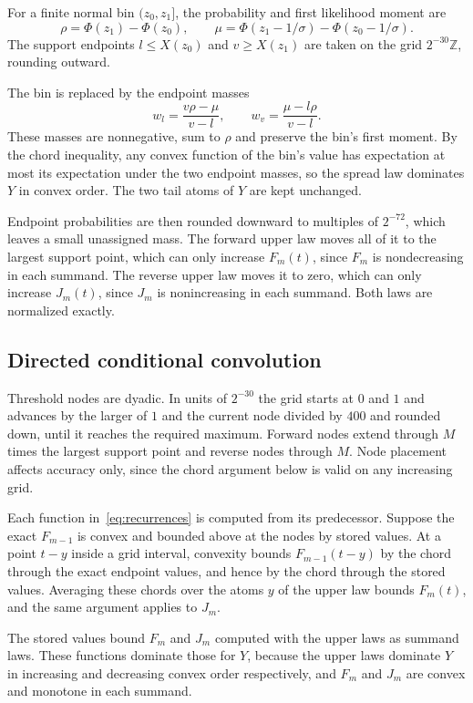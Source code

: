 \documentclass[conference]{IEEEtran}
\begin{document}
For a finite normal bin $(z_0,z_1]$, the probability and first likelihood moment are
\[
 \rho=\Phi(z_1)-\Phi(z_0),\qquad
 \mu=\Phi(z_1-1/\sigma)-\Phi(z_0-1/\sigma).
\]
The support endpoints $l\le X(z_0)$ and $v\ge X(z_1)$ are taken on the grid $2^{-30}\mathbb Z$, rounding outward.

The bin is replaced by the endpoint masses
\begin{equation}\label{eq:spread}
 w_l=\frac{v\rho-\mu}{v-l},\qquad
 w_v=\frac{\mu-l\rho}{v-l}.
\end{equation}
These masses are nonnegative, sum to $\rho$ and preserve the bin's first moment. By the chord inequality, any convex function of the bin's value has expectation at most its expectation under the two endpoint masses, so the spread law dominates $Y$ in convex order. The two tail atoms of $Y$ are kept unchanged.

Endpoint probabilities are then rounded downward to multiples of $2^{-72}$, which leaves a small unassigned mass. The forward upper law moves all of it to the largest support point, which can only increase $F_m(t)$, since $F_m$ is nondecreasing in each summand. The reverse upper law moves it to zero, which can only increase $J_m(t)$, since $J_m$ is nonincreasing in each summand. Both laws are normalized exactly.

\subsection{Directed conditional convolution}
Threshold nodes are dyadic. In units of $2^{-30}$ the grid starts at $0$ and $1$ and advances by the larger of $1$ and the current node divided by $400$ and rounded down, until it reaches the required maximum. Forward nodes extend through $M$ times the largest support point and reverse nodes through $M$. Node placement affects accuracy only, since the chord argument below is valid on any increasing grid.

Each function in~\eqref{eq:recurrences} is computed from its predecessor. Suppose the exact $F_{m-1}$ is convex and bounded above at the nodes by stored values. At a point $t-y$ inside a grid interval, convexity bounds $F_{m-1}(t-y)$ by the chord through the exact endpoint values, and hence by the chord through the stored values. Averaging these chords over the atoms $y$ of the upper law bounds $F_m(t)$, and the same argument applies to $J_m$.

The stored values bound $F_m$ and $J_m$ computed with the upper laws as summand laws. These functions dominate those for $Y$, because the upper laws dominate $Y$ in increasing and decreasing convex order respectively, and $F_m$ and $J_m$ are convex and monotone in each summand.
\end{document}
